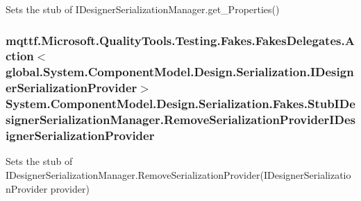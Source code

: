 Sets the stub of I\-Designer\-Serialization\-Manager.\-get\-\_\-\-Properties()

\hypertarget{class_system_1_1_component_model_1_1_design_1_1_serialization_1_1_fakes_1_1_stub_i_designer_serialization_manager_a2ec0c367a787f39a879e0584fd7cca60}{
\subsubsection[{Remove\-Serialization\-Provider\-I\-Designer\-Serialization\-Provider}]{\setlength{\rightskip}{0pt plus 5cm}mqttf.\-Microsoft.\-Quality\-Tools.\-Testing.\-Fakes.\-Fakes\-Delegates.\-Action$<$global.\-System.\-Component\-Model.\-Design.\-Serialization.\-I\-Designer\-Serialization\-Provider$>$ System.\-Component\-Model.\-Design.\-Serialization.\-Fakes.\-Stub\-I\-Designer\-Serialization\-Manager.\-Remove\-Serialization\-Provider\-I\-Designer\-Serialization\-Provider}}\label{class_system_1_1_component_model_1_1_design_1_1_serialization_1_1_fakes_1_1_stub_i_designer_serialization_manager_a2ec0c367a787f39a879e0584fd7cca60}


Sets the stub of I\-Designer\-Serialization\-Manager.\-Remove\-Serialization\-Provider(\-I\-Designer\-Serialization\-Provider provider)

